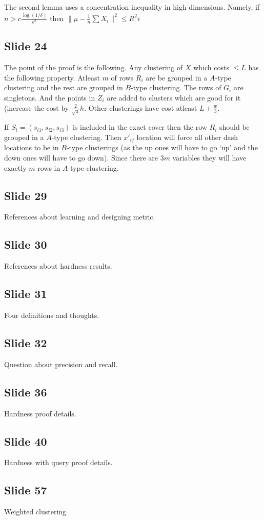 \documentclass[12pt]{article}
\begin{document}
The second lemma uses a concentration inequality in high dimensions. Namely, if $n > c\frac{\log (1/\delta)}{\epsilon^2}$ then $\|\mu - \frac{1}{n}\sum X_i\|^2 \le R^2 \epsilon$ 

\subsection*{Slide 24}
The point of the proof is the following. Any clustering of $X$ which costs $\le L$ has the following property. Atleast $m$ of rows $R_i$ are be grouped in a $A$-type clustering and the rest are grouped in $B$-type clustering. The rows of $G_i$ are singletons. And the points in $Z_i$ are added to clusters which are good for it (increase the cost by $\frac{2}{\sqrt{3}}h$. Other clusterings have cost atleast $L + \frac{w}{3}$. 

If $S_i = (s_{i1}, s_{i2}, s_{i3})$ is included in the exact cover then the row $R_i$ should be grouped in a $A$-type clustering. Then $x'_{ij}$ location will force all other dash locations to be in $B$-type clusterings (as the up ones will have to go `up' and the down ones will have to go down). Since there are $3m$ variables they will have exactly $m$ rows in $A$-type clustering. 

\subsection*{Slide 29}
References about learning and designing metric.

\subsection*{Slide 30}
References about hardness results.

\subsection*{Slide 31}
Four definitions and thoughts.

\subsection*{Slide 32}
Question about precision and recall.

\subsection*{Slide 36}
Hardness proof details.

\subsection*{Slide 40}
Hardness with query proof details.

\subsection*{Slide 57}
Weighted clustering
\end{document}
